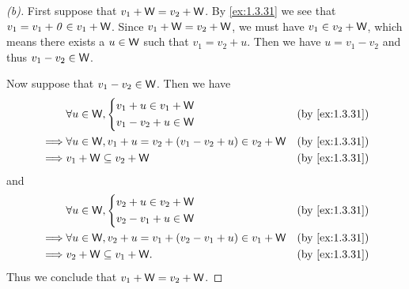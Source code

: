 \begin{proof}[(b)]
  First suppose that \(v_1 + \mathsf{W} = v_2 + \mathsf{W}\).
  By \cref{ex:1.3.31} we see that \(v_1 = v_1 + \mathit{0} \in v_1 + \mathsf{W}\).
  Since \(v_1 + \mathsf{W} = v_2 + \mathsf{W}\), we must have \(v_1 \in v_2 + \mathsf{W}\), which means there exists a \(u \in \mathsf{W}\) such that \(v_1 = v_2 + u\).
  Then we have \(u = v_1 - v_2\) and thus \(v_1 - v_2 \in \mathsf{W}\).

  Now suppose that \(v_1 - v_2 \in \mathsf{W}\).
  Then we have
  \begin{align*}
             & \forall u \in \W, \begin{dcases}
                                   v_1 + u \in v_1 + \W \\
                                   v_1 - v_2 + u \in \W
                                 \end{dcases}                               &  & \by{ex:1.3.31}   \\
    \implies & \forall u \in \W, v_1 + u = v_2 + (v_1 - v_2 + u) \in v_2 + \W &  & \by{ex:1.3.31} \\
    \implies & v_1 + \W \subseteq v_2 + \W                                    &  & \by{ex:1.3.31}
  \end{align*}
  and
  \begin{align*}
             & \forall u \in \W, \begin{dcases}
                                   v_2 + u \in v_2 + \W \\
                                   v_2 - v_1 + u \in \W
                                 \end{dcases}                               &  & \by{ex:1.3.31}   \\
    \implies & \forall u \in \W, v_2 + u = v_1 + (v_2 - v_1 + u) \in v_1 + \W &  & \by{ex:1.3.31} \\
    \implies & v_2 + \W \subseteq v_1 + \W.                                   &  & \by{ex:1.3.31}
  \end{align*}
  Thus we conclude that \(v_1 + \mathsf{W} = v_2 + \mathsf{W}\).
\end{proof}

